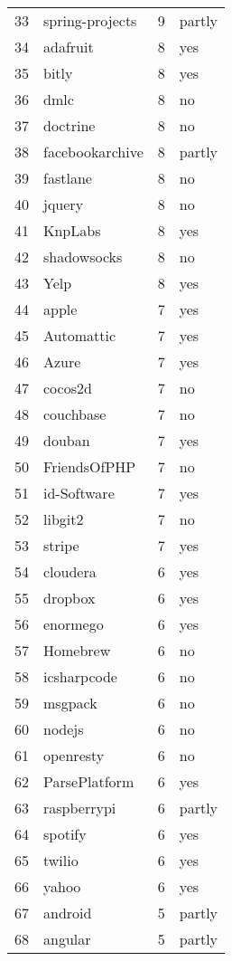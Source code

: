 {\begin{longtable}{rlrl}
    33 & spring-projects &   9 & partly \\
    34 & adafruit &   8 & yes \\
    35 & bitly &   8 & yes \\
    36 & dmlc &   8 & no \\
    37 & doctrine &   8 & no \\
    38 & facebookarchive &   8 & partly \\
    39 & fastlane &   8 & no \\
    40 & jquery &   8 & no \\
    41 & KnpLabs &   8 & yes \\
    42 & shadowsocks &   8 & no \\
    43 & Yelp &   8 & yes \\
    44 & apple &   7 & yes \\
    45 & Automattic &   7 & yes \\
    46 & Azure &   7 & yes \\
    47 & cocos2d &   7 & no \\
    48 & couchbase &   7 & no \\
    49 & douban &   7 & yes \\
    50 & FriendsOfPHP &   7 & no \\
    51 & id-Software &   7 & yes \\
    52 & libgit2 &   7 & no \\
    53 & stripe &   7 & yes \\
    54 & cloudera &   6 & yes \\
    55 & dropbox &   6 & yes \\
    56 & enormego &   6 & yes \\
    57 & Homebrew &   6 & no \\
    58 & icsharpcode &   6 & no \\
    59 & msgpack &   6 & no \\
    60 & nodejs &   6 & no \\
    61 & openresty &   6 & no \\
    62 & ParsePlatform &   6 & yes \\
    63 & raspberrypi &   6 & partly \\
    64 & spotify &   6 & yes \\
    65 & twilio &   6 & yes \\
    66 & yahoo &   6 & yes \\
    67 & android &   5 & partly \\
    68 & angular &   5 & partly \\

\end{longtable}}
